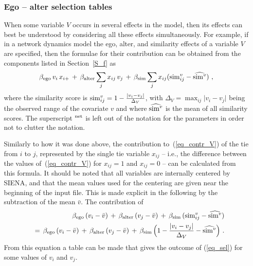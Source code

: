 \documentclass[a4paper,fleqn]{article}
\newcommand{\+}{\, + \,}
\newcommand{\si}{{\sf SIENA}}
\begin{document}
{\subsubsection{Ego -- alter selection tables}

When some variable $V$ occurs in several effects in the model,
then its effects can best be understood
by considering all these effects simultaneously.
For example, if in a network dynamics model the
ego, alter, and similarity effects of a variable $V$ are specified,
then the formulae for their contribution can be obtained
from the components listed in Section~\ref{S_f} as
\begin{equation}
 \beta_{\rm ego}\, v_i \, x_{i+} \, + \, \beta_{\rm alter}  \sum_j x_{ij}\, v_j \, + \,
        \beta_{\rm sim}  \sum_j x_{ij} ({\rm sim}^v_{ij} - \widehat{{\rm sim}^v}) \ ,
        \label{eq_contr_V}
\end{equation}
where the similarity score is
${\rm sim}^v_{ij}= 1 - \frac{\vert v_i - v_j \vert}{\Delta_V}$, with
$\Delta_V=\max_{ij}\vert v_i - v_j \vert$ being the observed range of the covariate $v$
and where $\widehat{{\rm sim}^v}$ is the mean of all similarity scores.
The superscript $^{\rm net}$ is left out of the notation for the parameters
in order not to clutter the notation.

Similarly to how it was done above, the contribution to~(\ref{eq_contr_V})
of the tie from $i$ to $j$, represented by the
single tie variable $x_{ij}$ -- i.e., the difference
between the values of~(\ref{eq_contr_V}) for $x_{ij}=1$
and $x_{ij}=0$  --  can be calculated from this formula.
It should be noted that all variables are internally centered by \si,
and that the mean values used for the centering
are given near the beginning of the input file.
This is made explicit in the following by the subtraction
of the mean $\bar v$. The contribution of
\begin{eqnarray}
  & & \beta_{\rm ego}\, (v_i - \bar v)  \, + \, \beta_{\rm alter}\,  (v_j - \bar v) \, + \,
        \beta_{\rm sim} \, ({\rm sim}^v_{ij} - \widehat{{\rm sim}^v} ) \nonumber \\
 && = \, \beta_{\rm ego}\, (v_i - \bar v)  \, + \, \beta_{\rm alter}\,  (v_j - \bar v) \, + \,
        \beta_{\rm sim} \,  \Big( 1 - \frac{\vert v_i - v_j \vert}{\Delta_V} - \widehat{{\rm sim}^v} \Big) \ .
                 \label{eq_sel}
\end{eqnarray}
From this equation a table can be made that gives the
outcome of (\ref{eq_sel}) for some values of $v_i$ and $v_j$.


}
\end{document}
